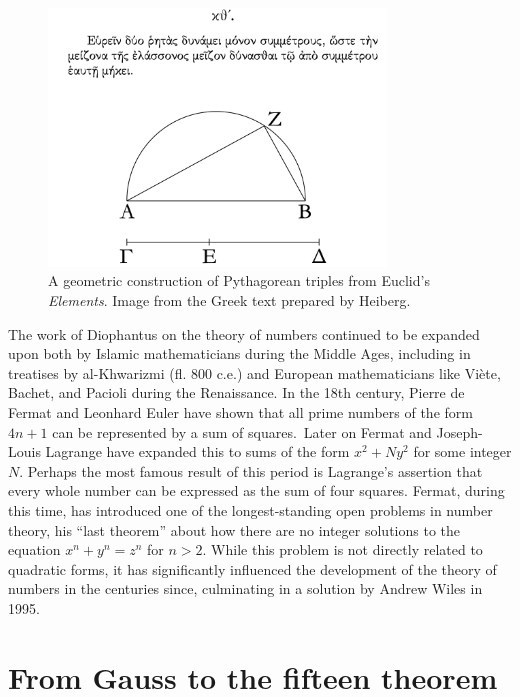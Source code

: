 \begin{figure}
    \centering
    \includegraphics[width=0.8\textwidth]{assets/euclid.png}
    \caption[A geometric construction of Pythagorean triples.]{A geometric
    construction of Pythagorean triples from Euclid's \emph{Elements}. Image
    from the Greek text prepared by Heiberg. \cite{heiberg1885euclid}}
    \label{fig:pythagorean-triples}
\end{figure}


The work of Diophantus on the theory of numbers continued to be expanded upon
both by Islamic mathematicians during the Middle Ages, including in treatises by
al-Khwarizmi (fl. 800 {\sc c.e.}) and European mathematicians
like Vi\`ete, Bachet, and Pacioli during the Renaissance. In the 18th century,
Pierre de Fermat and Leonhard Euler have shown that all prime numbers of the
form \(4n + 1\) can be represented by a sum of
squares.\,\cite{hahn2008quadratic} Later on Fermat and Joseph-Louis Lagrange
have expanded this to sums of the form \(x^2 + Ny^2\) for some integer \(N\).
Perhaps the most famous result of this period is Lagrange's assertion that every
whole number can be expressed as the sum of four squares. Fermat, during this
time, has introduced one of the longest-standing open problems in number theory,
his ``last theorem'' about how there are no integer solutions to the equation
\(x^n + y^n = z^n\) for \(n > 2\). While this problem is not directly related to
quadratic forms, it has significantly influenced the development of the theory
of numbers in the centuries since, culminating in a solution by Andrew Wiles in
1995. \cite{wiles1995modular}

\section{From Gauss to the fifteen theorem}

